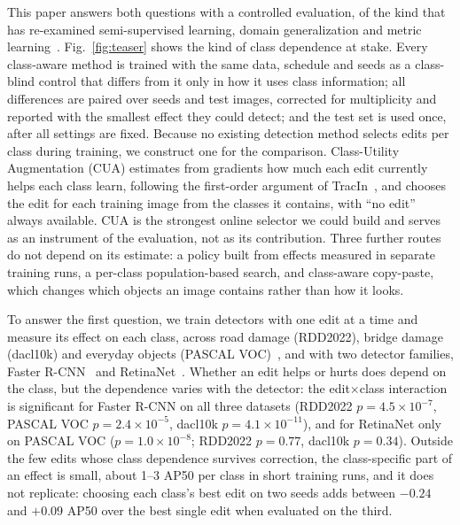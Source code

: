 \documentclass[conference]{IEEEtran}
\begin{document}
This paper answers both questions with a controlled evaluation, of the kind that has re-examined semi-supervised learning, domain generalization and metric learning~\cite{oliver2018realistic,gulrajani2021search,musgrave2020metric}. Fig.~\ref{fig:teaser} shows the kind of class dependence at stake. Every class-aware method is trained with the same data, schedule and seeds as a class-blind control that differs from it only in how it uses class information; all differences are paired over seeds and test images, corrected for multiplicity and reported with the smallest effect they could detect; and the test set is used once, after all settings are fixed. Because no existing detection method selects edits per class during training, we construct one for the comparison. Class-Utility Augmentation (CUA) estimates from gradients how much each edit currently helps each class learn, following the first-order argument of TracIn~\cite{pruthi2020tracin}, and chooses the edit for each training image from the classes it contains, with ``no edit'' always available. CUA is the strongest online selector we could build and serves as an instrument of the evaluation, not as its contribution. Three further routes do not depend on its estimate: a policy built from effects measured in separate training runs, a per-class population-based search, and class-aware copy-paste, which changes which objects an image contains rather than how it looks.

To answer the first question, we train detectors with one edit at a time and measure its effect on each class, across road damage (RDD2022), bridge damage (dacl10k) and everyday objects (PASCAL VOC)~\cite{everingham2010voc}, and with two detector families, Faster R-CNN~\cite{ren2017faster} and RetinaNet~\cite{lin2017focal}. Whether an edit helps or hurts does depend on the class, but the dependence varies with the detector: the edit$\times$class interaction is significant for Faster R-CNN on all three datasets (RDD2022 $p=4.5\times10^{-7}$, PASCAL VOC $p=2.4\times10^{-5}$, dacl10k $p=4.1\times10^{-11}$), and for RetinaNet only on PASCAL VOC ($p=1.0\times10^{-8}$; RDD2022 $p=0.77$, dacl10k $p=0.34$). Outside the few edits whose class dependence survives correction, the class-specific part of an effect is small, about 1--3 AP50 per class in short training runs, and it does not replicate: choosing each class's best edit on two seeds adds between $-0.24$ and $+0.09$ AP50 over the best single edit when evaluated on the third.
\end{document}
